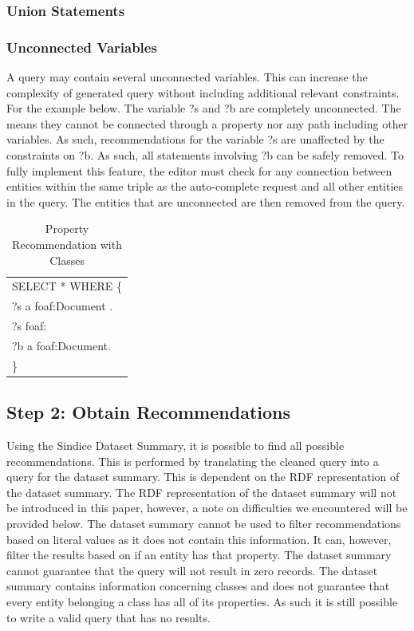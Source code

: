 \documentclass[11pt,onecolumn]{article}
\newcommand{\tab}{\hspace*{2em}}
\begin{document}
\subsubsection{Union Statements}




\subsubsection{Unconnected Variables}
A query may contain several unconnected variables.  This can increase the complexity of generated query without including additional relevant constraints.  For the example below.  The variable ?s and ?b are completely unconnected.  The means they cannot be connected through a  property nor any path including other variables.  As such, recommendations for the variable ?s are unaffected by the constraints on ?b.  As such, all statements involving ?b can be safely removed.  To fully implement this feature, the editor must check for any connection between entities within the same triple as the auto-complete request and all other entities in the query.  The entities that are unconnected are then removed from the query.

\begin{table}[h!]
\begin{center}
  \begin{tabular}{| l | }
    \hline
    SELECT * WHERE \{\\  
    \tab ?s a foaf:Document .\\ 
    \tab ?s foaf: \\
    \tab ?b a foaf:Document.\\ 
    \}    \\ \hline
  \end{tabular}
\end{center}
\caption{Property Recommendation with Classes}
\end{table}

\subsection{Step 2: Obtain Recommendations}
Using the Sindice Dataset Summary, it is possible to find all possible recommendations.  This is performed by translating the cleaned query into a query for the dataset summary.  This is dependent on the RDF representation of the dataset summary.  The RDF representation of the dataset summary will not be introduced in this paper, however, a note on difficulties we encountered will be provided below.  The dataset summary cannot be used to filter recommendations based on literal values as it does not contain this information.  It can, however, filter the results based on if an entity has that property.  The dataset summary cannot guarantee that the query will not result in zero records.  The dataset summary contains information concerning classes and does not guarantee that every entity belonging a class has all of its properties.  As such it is still possible to write a valid query that has no results.
\end{document}

